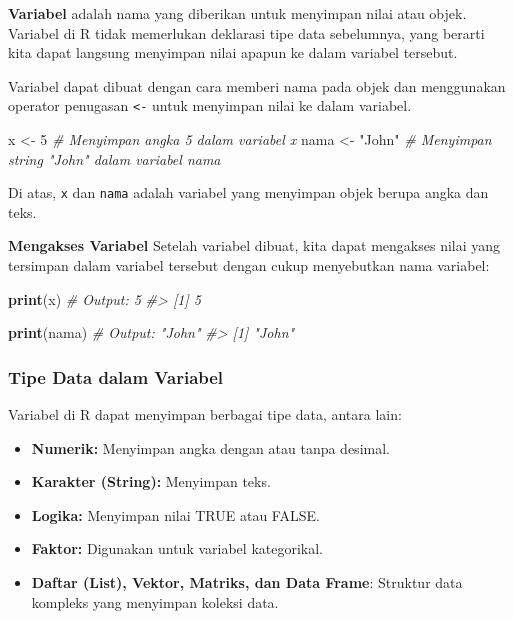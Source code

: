 \documentclass[
  oneside]{book}
\newenvironment{Shaded}{\begin{snugshade}}{\end{snugshade}}
\newcommand{\CommentTok}[1]{\textcolor[rgb]{0.56,0.35,0.01}{\textit{#1}}}
\newcommand{\DecValTok}[1]{\textcolor[rgb]{0.00,0.00,0.81}{#1}}
\newcommand{\FunctionTok}[1]{\textcolor[rgb]{0.13,0.29,0.53}{\textbf{#1}}}
\newcommand{\NormalTok}[1]{#1}
\newcommand{\OtherTok}[1]{\textcolor[rgb]{0.56,0.35,0.01}{#1}}
\newcommand{\StringTok}[1]{\textcolor[rgb]{0.31,0.60,0.02}{#1}}
\begin{document}
\textbf{Variabel} adalah nama yang diberikan untuk menyimpan nilai atau
objek. Variabel di R tidak memerlukan deklarasi tipe data sebelumnya,
yang berarti kita dapat langsung menyimpan nilai apapun ke dalam
variabel tersebut.

Variabel dapat dibuat dengan cara memberi nama pada objek dan
menggunakan operator penugasan \texttt{\textless{}-} untuk menyimpan nilai ke dalam
variabel.

\begin{Shaded}
\begin{Highlighting}[]
\NormalTok{x }\OtherTok{\textless{}{-}} \DecValTok{5}      \CommentTok{\# Menyimpan angka 5 dalam variabel x}
\NormalTok{nama }\OtherTok{\textless{}{-}} \StringTok{"John"}  \CommentTok{\# Menyimpan string "John" dalam variabel nama}
\end{Highlighting}
\end{Shaded}

Di atas, \texttt{x} dan \texttt{nama} adalah variabel yang menyimpan objek berupa
angka dan teks.

\textbf{Mengakses Variabel} Setelah variabel dibuat, kita dapat mengakses
nilai yang tersimpan dalam variabel tersebut dengan cukup menyebutkan
nama variabel:

\begin{Shaded}
\begin{Highlighting}[]
\FunctionTok{print}\NormalTok{(x)    }\CommentTok{\# Output: 5}
\CommentTok{\#\textgreater{} [1] 5}
\end{Highlighting}
\end{Shaded}

\begin{Shaded}
\begin{Highlighting}[]
\FunctionTok{print}\NormalTok{(nama) }\CommentTok{\# Output: "John"}
\CommentTok{\#\textgreater{} [1] "John"}
\end{Highlighting}
\end{Shaded}

\subsubsection*{Tipe Data dalam Variabel}\label{tipe-data-dalam-variabel}

Variabel di R dapat menyimpan berbagai tipe data, antara lain:

\begin{itemize}
\item
  \textbf{Numerik:} Menyimpan angka dengan atau tanpa desimal.
\item
  \textbf{Karakter (String):} Menyimpan teks.
\item
  \textbf{Logika:} Menyimpan nilai TRUE atau FALSE.
\item
  \textbf{Faktor:} Digunakan untuk variabel kategorikal.
\item
  \textbf{Daftar (List), Vektor, Matriks, dan Data Frame}: Struktur data
  kompleks yang menyimpan koleksi data.
\end{itemize}
\end{document}
